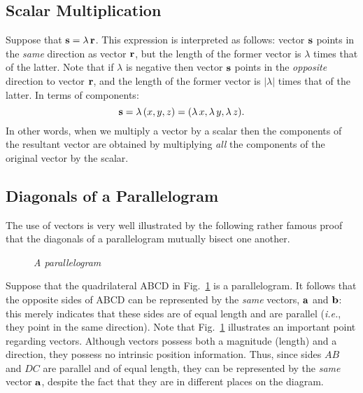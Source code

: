 \subsection{Scalar Multiplication}
Suppose that ${\bf s} = \lambda\,{\bf r}$. This expression is interpreted as
follows: vector ${\bf s}$ points in the {\em same} direction as vector ${\bf r}$, but
the length of the former vector is $\lambda$ times that of the latter. Note
that if $\lambda$ is negative then vector ${\bf s}$ points in the {\em opposite} direction to
 vector ${\bf r}$, and
the length of the former vector is $|\lambda|$ times that of the latter. In terms
of components:
\begin{equation}
{\bf s} = \lambda\,(x,y,z) = (\lambda\,x, \lambda\,y, \lambda\,z).
\end{equation}
In other words, when we multiply a vector by a scalar then  the components of the resultant
vector are obtained 
by multiplying {\em all} the components of the original vector by the scalar.

\subsection{Diagonals of a Parallelogram}
The use of vectors is very well illustrated by the following rather famous proof
that the diagonals of a parallelogram mutually bisect one another.

\begin{figure}
\epsfysize=1.5in
\centerline{}
\caption{\em A parallelogram}\label{f13}   
\end{figure}

Suppose that the quadrilateral  ABCD in Fig.~\ref{f13} is a parallelogram. It follows that
the opposite sides of ABCD can be represented by the
{\em same} vectors, ${\bf a}$ and ${\bf b}$: this merely indicates that these sides are of
equal length and are parallel ({\em i.e.}, they point in the same direction). Note that
Fig.~\ref{f13} illustrates an important point regarding vectors. Although vectors possess
both a magnitude (length) and a direction, they possess no intrinsic position information. 
Thus, since sides $AB$ and $DC$ are parallel  and of equal length, they can be represented
by the {\em same} vector ${\bf a}$, despite the fact that they are in different places on the
diagram.

